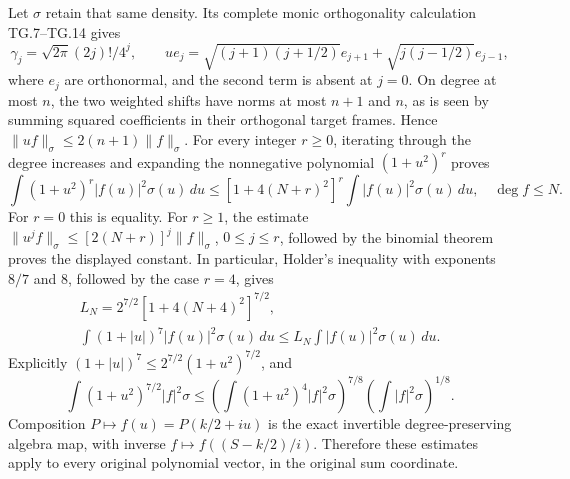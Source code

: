 Let \(\sigma\) retain that same density. Its complete monic
orthogonality calculation TG.7--TG.14 gives
\[
 \gamma_j=\sqrt{2\pi}(2j)!/4^j,\qquad
 u e_j=\sqrt{(j+1)(j+1/2)}e_{j+1}
           +\sqrt{j(j-1/2)}e_{j-1},
 \tag{PGD.19}\label{GraphV2:eq:pgd-Gamma-recurrence}
\]
where \(e_j\) are orthonormal, and the second term is absent at
\(j=0\). On degree at most \(n\), the two weighted shifts have
norms at most \(n+1\) and \(n\), as is seen by summing squared
coefficients in their orthogonal target frames. Hence
\(\|uf\|_\sigma\leq2(n+1)\|f\|_\sigma\).
For every integer \(r\geq0\), iterating through the degree increases
and expanding the nonnegative polynomial \((1+u^2)^r\) proves
\[
 \int(1+u^2)^r|f(u)|^2\sigma(u)\,du
       \leq[1+4(N+r)^2]^r\int|f(u)|^2\sigma(u)\,du,
 \quad\deg f\leq N.
 \tag{PGD.20}\label{GraphV2:eq:pgd-integer-multiplier}
\]
For \(r=0\) this is equality. For \(r\geq1\), the estimate
\(\|u^jf\|_\sigma\leq[2(N+r)]^j\|f\|_\sigma\),
\(0\leq j\leq r\), followed by the binomial theorem proves the
displayed constant. In particular, Holder's inequality with exponents
\(8/7\) and \(8\), followed by the case \(r=4\), gives
\[
 \begin{gathered}
 L_N=2^{7/2}[1+4(N+4)^2]^{7/2},\\
 \int(1+|u|)^7|f(u)|^2\sigma(u)\,du
                \leq L_N\int|f(u)|^2\sigma(u)\,du.
 \end{gathered}
 \tag{PGD.21}\label{GraphV2:eq:pgd-seven-multiplier}
\]
Explicitly \((1+|u|)^7\leq2^{7/2}(1+u^2)^{7/2}\), and
\[
 \int(1+u^2)^{7/2}|f|^2\sigma
 \leq\left(\int(1+u^2)^4|f|^2\sigma\right)^{7/8}
        \left(\int|f|^2\sigma\right)^{1/8}.
\]
Composition \(P\mapsto f(u)=P(k/2+iu)\) is the exact invertible
degree-preserving algebra map, with inverse
\(f\mapsto f((S-k/2)/i)\). Therefore these estimates apply to
every original polynomial vector, in the original sum coordinate.

